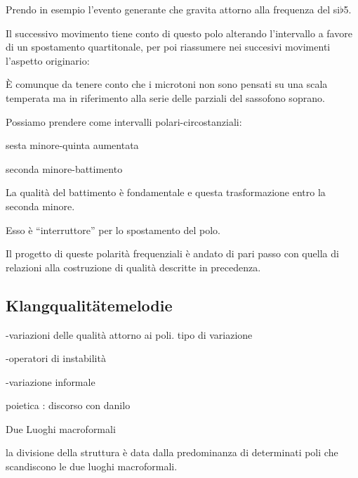 Prendo in esempio l’evento generante che gravita attorno alla frequenza del si{\large$\flat$}5.

Il successivo movimento tiene conto di questo polo alterando l’intervallo a favore
di un spostamento quartitonale, per poi riassumere nei succesivi movimenti l’aspetto originario:

È comunque da tenere conto che i microtoni non sono pensati su una scala temperata ma
in riferimento alla serie delle parziali del sassofono soprano. 

Possiamo prendere come intervalli polari-circostanziali:

\begin{center}
sesta minore-quinta aumentata
\end{center} 

\begin{center}
seconda minore-battimento 
\end{center} 

La qualità del battimento è fondamentale e questa trasformazione entro la seconda minore.

Esso è “interruttore” per lo spostamento del polo.

Il progetto di queste polarità frequenziali è andato di pari passo con quella di
relazioni alla costruzione di qualità descritte in precedenza.

\subsection{Klangqualitätemelodie}

-variazioni delle qualità attorno ai poli. tipo di variazione

-operatori di instabilità

-variazione informale

 poietica : discorso con danilo

Due Luoghi macroformali


la divisione della struttura è data dalla predominanza di determinati poli che scandiscono  le due luoghi macroformali.








